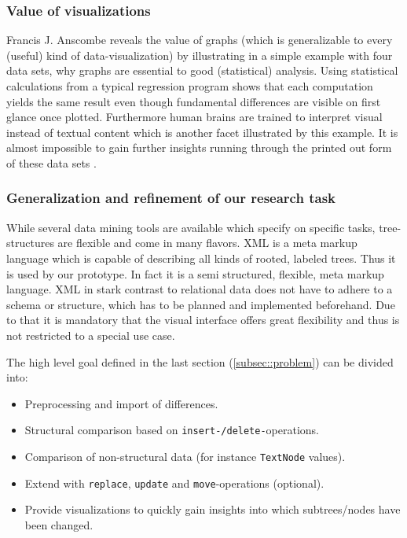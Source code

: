 \subsubsection{Value of visualizations}
Francis J. Anscombe reveals the value of graphs (which is generalizable to every (useful) kind of data-visualization) by illustrating in a simple example with four data sets, why graphs are essential to good (statistical) analysis. Using statistical calculations from a typical regression program shows that each computation yields the same result even though fundamental differences are visible on first glance once plotted. Furthermore human brains are trained to interpret visual instead of textual content which is another facet illustrated by this example. It is almost impossible to gain further insights running through the printed out form of these data sets \cite{ANSCOMBE}. 

\subsubsection{Generalization and refinement of our research task}
While several data mining tools are available which specify on specific tasks, tree-structures are flexible and come in many flavors. XML is a meta markup language which is capable of describing all kinds of rooted, labeled trees. Thus it is used by our prototype. In fact it is a semi structured, flexible, meta markup language. XML in stark contrast to relational data does not have to adhere to a schema or structure, which has to be planned and implemented beforehand. Due to that it is mandatory that the visual interface offers great flexibility and thus is not restricted to a special use case.

The high level goal defined in the last section (\ref{subsec::problem}) can be divided into:
\begin{itemize}
\item Preprocessing and import of differences.
\item Structural comparison based on \texttt{insert-/delete-}operations.
\item Comparison of non-structural data (for instance \texttt{TextNode} values).
\item Extend with \texttt{replace}, \texttt{update} and \texttt{move}-operations (optional).
\item Provide visualizations to quickly gain insights into which subtrees/nodes have been changed.
\end{itemize}

